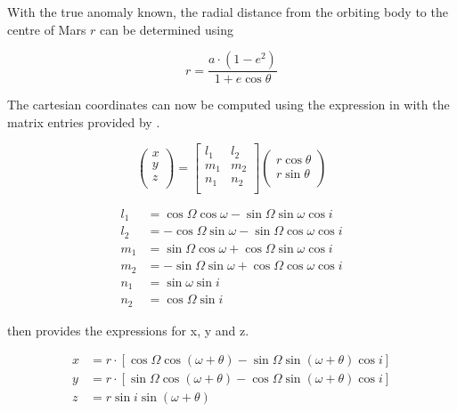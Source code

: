 \noindent
With the true anomaly known, the radial distance from the orbiting body to the centre of Mars $r$ can be determined using 

\begin{equation}\label{eq:radiuscomp}
r=\dfrac{a\cdot\left(1-e^{2}\right)}{1+e\cos\theta }
\end{equation}

\noindent
The cartesian coordinates can now be computed using the expression in  with the matrix entries provided by \citep{noomen2013basic}. 

\begin{equation}\label{eq:keptocartmat}
\begin{pmatrix}
x\\
y\\
z\\
\end{pmatrix}=
\begin{bmatrix}
l_{1} & l_{2}\\
m_{1} & m_{2}\\
n_{1} & n_{2}\\
\end{bmatrix}
\begin{pmatrix}
r\cos\theta \\
r\sin\theta \\
\end{pmatrix}
\end{equation}

\begin{equation}\label{eq:matrixent}
\begin{split}
 l_{1}&=\cos\Omega \cos\omega -\sin\Omega \sin\omega \cos i \\
 l_{2}&=-\cos\Omega \sin\omega -\sin\Omega \cos\omega \cos i \\
 m_{1}&=\sin\Omega \cos\omega +\cos\Omega \sin\omega \cos i \\
 m_{2}&=-\sin\Omega \sin\omega +\cos\Omega \cos\omega \cos i \\
 n_{1}&=\sin\omega \sin i \\
 n_{2}&=\cos\Omega \sin i 
\end{split}
\end{equation}

\noindent {} then provides the expressions for x, y and z.

\begin{equation}\label{eq:keptocartp}
\begin{split}
 x&=r\cdot\left[\cos\Omega \cos\left(\omega+\theta\right)-\sin\Omega \sin\left(\omega+\theta\right)\cos i \right]\\
 y&=r\cdot\left[\sin\Omega \cos\left(\omega+\theta\right)-\cos\Omega \sin\left(\omega+\theta\right)\cos i \right]\\
 z&=r\sin i \sin\left(\omega+\theta\right)
\end{split}
\end{equation}

